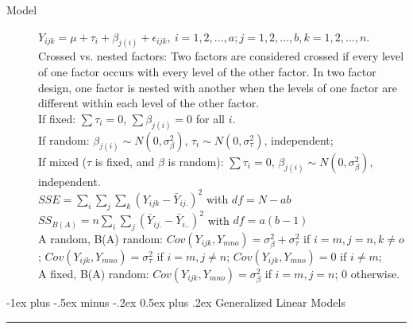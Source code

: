 \documentclass[10pt,landscape]{article}
\makeatletter
\renewcommand{\section}{\@startsection{section}{1}{0mm}%
                                {-1ex plus -.5ex minus -.2ex}%
                                {0.5ex plus .2ex}%
                                {\normalfont\large\bfseries}}
\makeatother
\begin{document}
\begin{multicols}{3}
\begin{description}
\item[Model] $Y_{ijk} = \mu + \tau_i + \beta_{j(i)} +  \epsilon_{ijk},\ i = 1,2,...,a; j = 1, 2,...,b, k= 1,2,...,n$. \\
Crossed vs. nested factors: Two factors are considered crossed if every level of one factor occurs with every level of the other factor. In two factor design, one factor is nested with another when the levels of one factor are different within each level of the other factor. \\
If fixed: $\sum \tau_i = 0$, $\sum \beta_{j(i)} = 0$ for all $i$.\\
If random: $\beta_{j(i)} \sim N(0, \sigma_{\beta}^2)$, $\tau_i \sim N(0, \sigma_{\tau}^2)$, independent;\\
If mixed ($\tau$ is fixed, and $\beta$ is random): $\sum \tau_i = 0$, $\beta_{j(i)} \sim N(0, \sigma_{\beta}^2)$, independent.\\
$SSE = \sum_i \sum_j \sum_k (Y_{ijk} - \bar{Y}_{ij.})^2$ with $df = N-ab$\\
$SS_{B(A)} = n\sum_i \sum_j (\bar{Y}_{ij.} - \bar{Y}_{i..})^2$ with $df = a(b-1)$ \\
A random, B(A) random: $Cov(Y_{ijk}, Y_{mno}) = \sigma_\beta^2 + \sigma_\tau^2$ if $i=m, j=n, k\neq o$; $Cov(Y_{ijk}, Y_{mno}) =  \sigma_\tau^2$ if $i=m, j\neq n$; $Cov(Y_{ijk}, Y_{mno}) = 0$ if $i\neq m$; \\
A fixed, B(A) random: $Cov(Y_{ijk}, Y_{mno}) = \sigma_\beta^2 $ if $i=m, j=n$; $0$ otherwise.
\end{description}

\section{Generalized Linear Models}\smallskip \hrule height 2pt \smallskip

\end{multicols}
\end{document}
